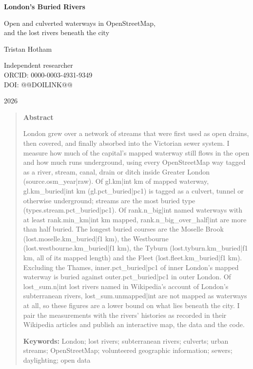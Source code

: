 \documentclass[11pt,a4paper]{article}
\begin{document}
\begin{center}
{\Large\bfseries London's Buried Rivers\par}
\vspace{0.4em}
{\large Open and culverted waterways in OpenStreetMap,\\and the lost rivers beneath the city\par}
\vspace{1.2em}
{\large Tristan Hotham\par}
\vspace{0.3em}
{\small Independent researcher\\
ORCID: 0000-0003-4931-9349\\
DOI: @@DOILINK@@\par}
\vspace{0.8em}
2026
\end{center}

\begin{quote}
\small
\begin{center}\textbf{Abstract}\end{center}
London grew over a network of streams that were first used as open drains, then covered, and finally absorbed into the Victorian sewer system. I measure how much of the capital's mapped waterway still flows in the open and how much runs underground, using every OpenStreetMap way tagged as a river, stream, canal, drain or ditch inside Greater London ({{source.osm_year|raw}}). Of {{gl.km|int}} km of mapped waterway, {{gl.km_buried|int}} km ({{gl.pct_buried|pc1}}) is tagged as a culvert, tunnel or otherwise underground; streams are the most buried type ({{types.stream.pct_buried|pc1}}). Of {{rank.n_big|int}} named waterways with at least {{rank.min_km|int}} km mapped, {{rank.n_big_over_half|int}} are more than half buried. The longest buried courses are the Moselle Brook ({{lost.moselle.km_buried|f1}} km), the Westbourne ({{lost.westbourne.km_buried|f1}} km), the Tyburn ({{lost.tyburn.km_buried|f1}} km, all of its mapped length) and the Fleet ({{lost.fleet.km_buried|f1}} km). Excluding the Thames, {{inner.pct_buried|pc1}} of inner London's mapped waterway is buried against {{outer.pct_buried|pc1}} in outer London. Of {{lost_sum.n|int}} lost rivers named in Wikipedia's account of London's subterranean rivers, {{lost_sum.unmapped|int}} are not mapped as waterways at all, so these figures are a lower bound on what lies beneath the city. I pair the measurements with the rivers' histories as recorded in their Wikipedia articles and publish an interactive map, the data and the code.

\textbf{Keywords:} London; lost rivers; subterranean rivers; culverts; urban streams; OpenStreetMap; volunteered geographic information; sewers; daylighting; open data
\end{quote}
\end{document}
